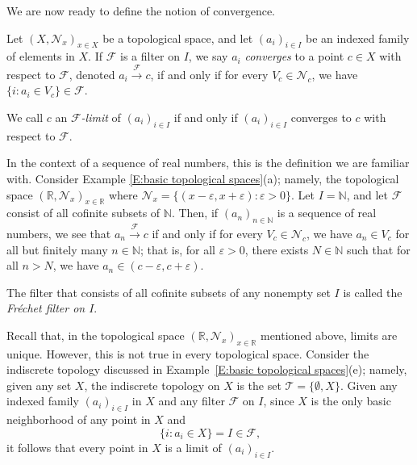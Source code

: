 \documentclass{scrartcl}
\begin{document}
We are now ready to define the notion of convergence.

\begin{definition}
Let $(X, \mathscr{N}_x)_{x\in X}$ be a topological space, and let $(a_i)_{i\in I}$ be an indexed family of elements in $X$. If $\mathscr{F}$ is a filter on $I$, we say $a_i$ \emph{converges} to a point $c\in X$ with respect to $\mathscr{F}$, denoted $a_i\overset{\mathscr{F}}\to c$, if and only if for every $V_c\in\mathscr{N}_c$, we have $\{i \colon a_i\in V_c\}\in\mathscr{F}$.


We call $c$ an \emph{$\mathscr{F}$-limit} of $(a_i)_{i\in I}$ if and only if $(a_i)_{i\in I}$ converges to $c$ with respect to $\mathscr{F}$.

\end{definition}

In the context of a sequence of real numbers, this is the definition we are familiar with. Consider Example \ref{E:basic topological spaces}(a); namely, the topological space $(\mathbb{R},\mathscr{N}_x)_{x\in \mathbb{R}}$ where $\mathscr{N}_x = \{(x-\varepsilon,x+\varepsilon) \colon \varepsilon>0\}$. Let $I=\mathbb{N}$, and let $\mathscr{F}$ consist of all cofinite subsets of $\mathbb{N}$. Then, if $(a_n)_{n\in \mathbb{N}}$ is a sequence of real numbers, we see that $a_n \overset{\mathscr{F}}\to c$ if and only if for every $V_c\in\mathscr{N}_c$, we have $a_n\in V_c$ for all but finitely many $n\in\mathbb{N}$; that is, for all $\varepsilon >0$, there exists  $N\in\mathbb{N}$ such that for all $n>N$, we have $a_n\in(c-\varepsilon,c+\varepsilon)$.

\begin{definition}
The filter that consists of all cofinite subsets of any nonempty set $I$ is called the \emph{Fr\'echet filter on $I$}.
\end{definition}

Recall that, in the topological space $(\mathbb{R},\mathscr{N}_x)_{x\in \mathbb{R}}$ mentioned above, limits are unique. However, this is not true in every topological space. Consider the indiscrete topology discussed in Example~\ref{E:basic topological spaces}(e); namely, given any set $X$, the indiscrete topology on $X$ is the set $\mathscr{T}=\{\emptyset, X\}$. Given any indexed family $(a_i)_{i\in I}$ in $X$ and any filter $\mathscr{F}$ on $I$, since $X$ is the only basic neighborhood of any point in $X$ and \[\{i\colon a_i\in X\}=I\in\mathscr{F}\text{,}\] it follows that every point in $X$ is a limit of $(a_i)_{i\in I}$.
\end{document}
